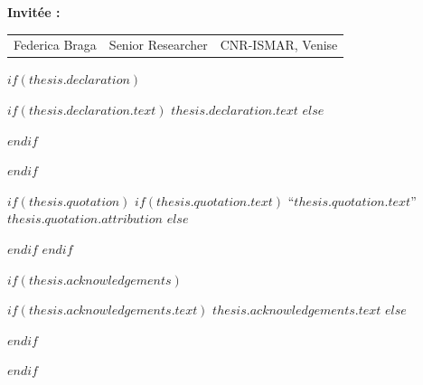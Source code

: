\begin{titlepage}
{\fontsize{11}{15}\selectfont \textbf{Invitée : }}


\begin{tabular}{@{}l l l@{}}
    {\fontsize{10}{14}\selectfont \textcolor{textgray}{Federica Braga}} & 
    {\fontsize{10}{14}\selectfont \textcolor{textgray}{Senior Researcher}} & 
    {\fontsize{10}{14}\selectfont \textcolor{textgray}{CNR-ISMAR, Venise}} \\

\end{tabular}
\end{titlepage}

\restoregeometry

\renewcommand{\familydefault}{\rmdefault}


$if(thesis.declaration)$
  \begin{declaration}
    \addchaptertocentry{\authorshipname} %
    $if(thesis.declaration.text)$
      $thesis.declaration.text$
    $else$
      
    $endif$
  \end{declaration}
  \startonrightwithgap
$endif$

$if(thesis.quotation)$
  \vspace*{0.2\textheight}
  $if(thesis.quotation.text)$
    \noindent``{\itshape $thesis.quotation.text$}''\bigbreak
    \hfill $thesis.quotation.attribution$
  $else$
    
  $endif$
$endif$


$if(thesis.acknowledgements)$
  \startonrightwithgap
  \begin{acknowledgements}
    \addchaptertocentry{\acknowledgementname} %
    $if(thesis.acknowledgements.text)$
      $thesis.acknowledgements.text$
    $else$
      
    $endif$
  \end{acknowledgements}
$endif$

